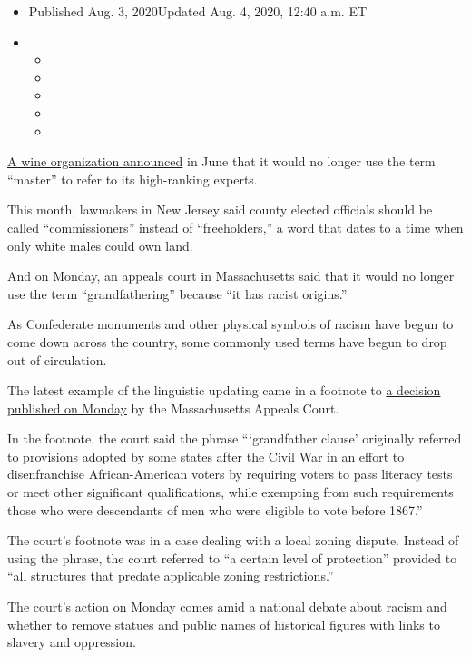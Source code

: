 \begin{itemize}
\item
  Published Aug. 3, 2020Updated Aug. 4, 2020, 12:40 a.m. ET
\item
  \begin{itemize}
  \item
  \item
  \item
  \item
  \item
  \end{itemize}
\end{itemize}

\href{https://www.nytimes.com/2020/06/22/us/wine-master.html}{A wine
organization announced} in June that it would no longer use the term
``master'' to refer to its high-ranking experts.

This month, lawmakers in New Jersey said county elected officials should
be
\href{https://www.nytimes.com/2020/07/10/nyregion/Freeholder-new-jersey.html}{called
``commissioners'' instead of ``freeholders,''} a word that dates to a
time when only white males could own land.

And on Monday, an appeals court in Massachusetts said that it would no
longer use the term ``grandfathering'' because ``it has racist
origins.''

As Confederate monuments and other physical symbols of racism have begun
to come down across the country, some commonly used terms have begun to
drop out of circulation.

The latest example of the linguistic updating came in a footnote to
\href{https://www.mass.gov/files/documents/2020/08/03/z19P1163.pdf}{a
decision published on Monday} by the Massachusetts Appeals Court.

In the footnote, the court said the phrase ```grandfather clause'
originally referred to provisions adopted by some states after the Civil
War in an effort to disenfranchise African-American voters by requiring
voters to pass literacy tests or meet other significant qualifications,
while exempting from such requirements those who were descendants of men
who were eligible to vote before 1867.''

The court's footnote was in a case dealing with a local zoning dispute.
Instead of using the phrase, the court referred to ``a certain level of
protection'' provided to ``all structures that predate applicable zoning
restrictions.''

The court's action on Monday comes amid a national debate about racism
and whether to remove statues and public names of historical figures
with links to slavery and oppression.

